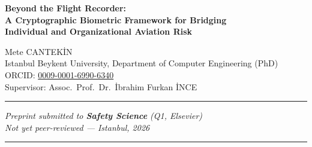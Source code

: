 \documentclass[12pt,a4paper]{article}
\begin{document}

\begin{titlepage}
\begin{center}
\vspace*{2cm}

{\LARGE\bfseries Beyond the Flight Recorder:\\[6pt]
A Cryptographic Biometric Framework for Bridging\\[6pt]
Individual and Organizational Aviation Risk}

\vspace{1.5cm}

{\large Mete CANTEKİN}\\[4pt]
{\normalsize Istanbul Beykent University, Department of Computer Engineering (PhD)}\\[2pt]
{\normalsize ORCID: \href{https://orcid.org/0009-0001-6990-6340}{0009-0001-6990-6340}}\\[2pt]
{\normalsize Supervisor: Assoc.\ Prof.\ Dr.\ İbrahim Furkan İNCE}

\vspace{1.5cm}

\rule{0.7\textwidth}{0.4pt}

\vspace{0.8cm}

{\small\itshape Preprint submitted to \textbf{Safety Science} (Q1, Elsevier)\\
Not yet peer-reviewed --- Istanbul, 2026}

\vspace{0.8cm}
\rule{0.7\textwidth}{0.4pt}

\end{center}
\end{titlepage}
\end{document}
